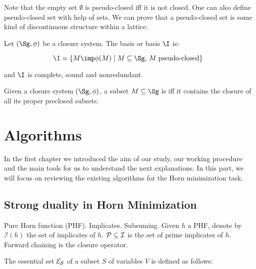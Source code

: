 \documentclass[a4paper]{report}
\begin{document}
Note that the empty set $\emptyset$ is pseudo-closed iff it is not closed. One 
can also define pseudo-closed set with help of  sets. We
can prove that a pseudo-closed set is some kind of discontinuous structure 
within a lattice.

\begin{definition} Let $(\Sg, \phi)$ be a 
closure system. The  basis or  basis
$\I$ is:

	\[ \I = \{ M \imp \phi(M) \; | \; M \subseteq \Sg, \, M \;
	 	\text{pseudo-closed} \} \]
	
\noindent and $\I$ is complete, sound and nonredundant.
\end{definition}


\begin{definition} Given a closure system $(\Sg, \phi)$,
a subset $M \subseteq \Sg$ is  iff it contains the closure of
all its proper preclosed subsets.
	
\end{definition}

\chapter{Algorithms}

In the first chapter we introduced the aim of our study, our working procedure
and the main tools for us to understand the next explanations. In this part, we
will focus on reviewing the existing algorithms for the Horn minimization task. 









\section{Strong duality in Horn Minimization}

Pure Horn function (PHF). Implicates. Subsuming. Given $h$ a PHF, denote by 
$\mathcal{I}(h)$ the set of implicates of $h$. $\cal{P} \subseteq \cal{I}$ is
the set of prime implicates of $h$. Forward chaining is the closure operator. 

The essential set $\cal{E}_S$ of a subset $S$ of variables $V$ is defined as
follows:
\end{document}
